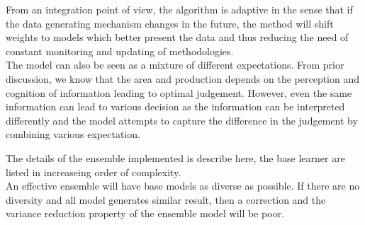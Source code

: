 \documentclass[nojss]{jss}\usepackage[]{graphicx}\usepackage[]{color}
\begin{document}
From an integration point of view, the algorithm is adaptive in the
sense that if the data generating mechanism changes in the future, the
method will shift weights to models which better present the data and
thus reducing the need of constant monitoring and updating of
methodologies.\\

The model can also be seen as a mixture of different
expectations. From prior discussion, we know that the area and
production depends on the perception and cognition of information
leading to optimal judgement. However, even the same information can
lead to various decision as the information can be interpreted
differently and the model attempts to capture the difference in the
judgement by combining various expectation.\\



\FloatBarrier


The details of the ensemble implemented is describe here, the base
learner are listed in increaseing order of complexity.\\

An effective ensemble will have base models as diverse as possible. If
there are no diversity and all model generates similar result, then a
correction and the variance reduction property of the ensemble model
will be poor.\\
\end{document}
